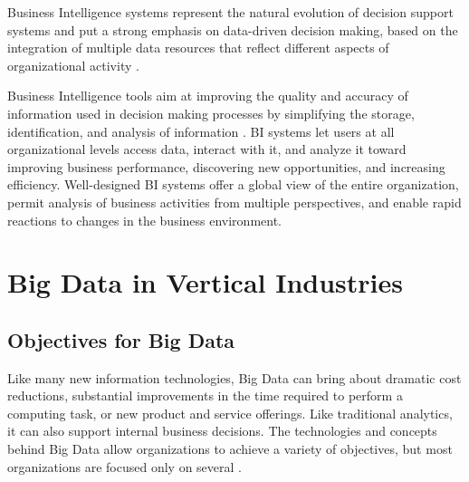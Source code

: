 \documentclass[runningheads]{llncs}
\begin{document}
Business Intelligence systems represent the natural evolution of decision support systems and put a strong emphasis on data-driven decision making, based on the integration of multiple data resources that reflect different aspects of organizational activity \cite{YOGEV}.

Business Intelligence tools aim at improving the quality and accuracy of information used in decision making processes by simplifying the storage, identification, and analysis of information \cite{NEGASH}. BI systems let users at all organizational levels access data, interact with it, and analyze it toward improving business performance, discovering new opportunities, and increasing efficiency. Well-designed BI systems offer a global view of the entire organization, permit analysis of business activities from multiple perspectives, and enable rapid reactions to changes in the business environment.

\section{Big Data in Vertical Industries}
\subsection{Objectives for Big Data}
Like many new information technologies, Big Data can bring about dramatic cost reductions, substantial improvements in the time required to perform a computing task, or new product and service offerings. Like traditional analytics, it can also support internal business decisions. The technologies and concepts behind Big Data allow organizations to achieve a variety of objectives, but most organizations are focused only on several \cite{DAVENPORT}.
\end{document}
